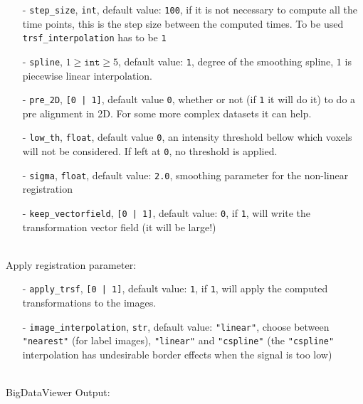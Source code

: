 \documentclass[10pt,a4paper]{book}
\begin{document}
\begin{itemize}
\item[-] \texttt{step\_size}, \texttt{int}, default value: \texttt{100}, if it is not necessary to compute all the time points, this is the step size between the computed times. To be used \texttt{trsf\_interpolation} has to be \texttt{1}
\item[-] \texttt{spline}, $1\geq \texttt{int} \geq 5$, default value: \texttt{1}, degree of the smoothing spline, $1$ is piecewise linear interpolation.
\item[-] \texttt{pre\_2D}, \texttt{[0 | 1]}, default value \texttt{0}, whether or not (if \texttt{1} it will do it) to do a pre alignment in 2D. For some more complex datasets it can help.
\item[-] \texttt{low\_th}, \texttt{float}, default value \texttt{0}, an intensity threshold bellow which voxels will not be considered. If left at \texttt{0}, no threshold is applied.
\item[-] \texttt{sigma}, \texttt{float}, default value: \texttt{2.0}, smoothing parameter for the non-linear registration
\item[-] \texttt{keep\_vectorfield}, \texttt{[0 | 1]}, default value: \texttt{0}, if \texttt{1}, will write the transformation vector field (it will be large!)
\end{itemize}~\\
Apply registration parameter:
\begin{itemize}
\item[-] \texttt{apply\_trsf}, \texttt{[0 | 1]}, default value: \texttt{1}, if \texttt{1}, will apply the computed transformations to the images.
\item[-] \texttt{image\_interpolation}, \texttt{str}, default value: \texttt{"linear"}, choose between \texttt{"nearest"} (for label images), \texttt{"linear"} and \texttt{"cspline"} (the \texttt{"cspline"} interpolation has undesirable border effects when the signal is too low)
\end{itemize}~\\
BigDataViewer Output:
\end{document}
